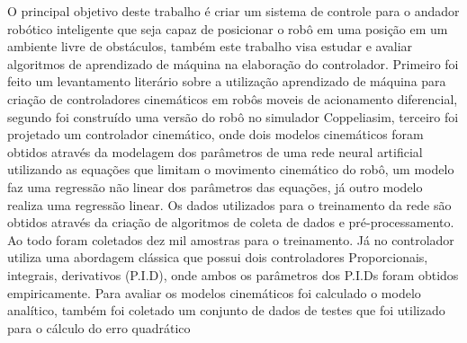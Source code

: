 %
%

O principal objetivo deste trabalho é criar um  sistema de
controle para o andador robótico inteligente que seja capaz de
posicionar o robô em uma posição em um ambiente livre de obstáculos,
também  este trabalho visa estudar e avaliar algoritmos de aprendizado
de máquina na elaboração do controlador. Primeiro foi feito um levantamento
literário sobre a utilização aprendizado de máquina para criação de
controladores cinemáticos em robôs moveis de acionamento diferencial,
segundo foi construído uma versão do robô no simulador Coppeliasim,
terceiro foi projetado um controlador cinemático, onde dois modelos
cinemáticos foram obtidos através da modelagem dos parâmetros de uma
rede neural artificial utilizando as equações que limitam o movimento
cinemático do robô, um modelo faz uma regressão não linear dos
parâmetros das equações, já outro modelo realiza uma regressão linear.
Os dados utilizados para o treinamento da rede são obtidos
através da criação de  algoritmos de coleta de dados e pré-processamento.
Ao todo foram coletados dez mil
amostras para o treinamento. Já no controlador utiliza uma abordagem
clássica que possui  dois controladores
Proporcionais, integrais, derivativos (P.I.D),
onde ambos os parâmetros dos P.I.Ds foram obtidos empiricamente.
Para avaliar os modelos cinemáticos foi calculado o modelo analítico,
também foi coletado um conjunto de
dados de testes que foi utilizado para o cálculo do erro quadrático
